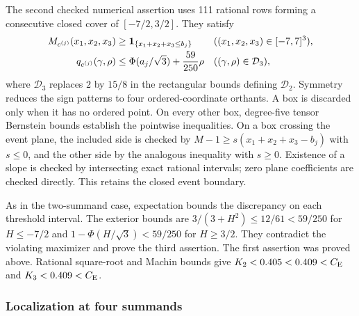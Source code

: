 The second checked numerical assertion uses 111 rational rows forming a consecutive closed cover of
$[-7/2,3/2]$. They satisfy
\begin{align*}
 M_{c^{(j)}}(x_1,x_2,x_3)&\ge\mathbf1_{\{x_1+x_2+x_3\le b_j\}}
                    &&((x_1,x_2,x_3)\in[-7,7]^3),\\
 q_{c^{(j)}}(\gamma,\rho)&\le\Phi(a_j/\sqrt3)+\frac{59}{250}\rho
                    &&((\gamma,\rho)\in\mathcal D_3),
\end{align*}
where $\mathcal D_3$ replaces $2$ by $15/8$ in the rectangular
bounds defining $\mathcal D_2$.
Symmetry reduces the sign patterns to four ordered-coordinate
orthants.  A box is discarded only when it has no ordered point.
On every other box, degree-five tensor Bernstein bounds establish
the pointwise inequalities.  On a box crossing the event plane,
the included side is checked by $M-1\ge s(x_1+x_2+x_3-b_j)$ with
$s\le0$, and the other side by the analogous inequality with $s\ge0$.
Existence of a slope is checked by intersecting exact rational intervals;
zero plane coefficients are checked directly.  This retains the closed
event boundary.

As in the two-summand case, expectation bounds the discrepancy on each
threshold interval.  The exterior bounds are
$3/(3+H^2)\le12/61<59/250$ for $H\le-7/2$ and
$1-\Phi(H/\sqrt3)<59/250$ for $H\ge3/2$.
They contradict the violating maximizer and prove the third assertion.
The first assertion was proved above.  Rational square-root and Machin
bounds give $K_2<0.405<0.409<C_{\mathrm E}$ and $K_3<0.409<C_{\mathrm E}$.

\subsubsection{Localization at four summands}
\label{j:finite:n4-localization-section}

